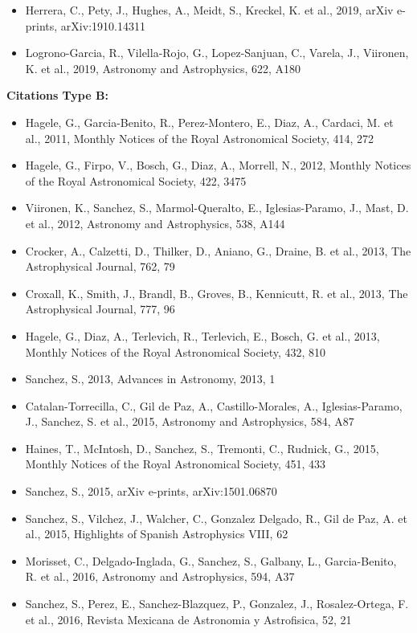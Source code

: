 \documentclass{letter}
\begin{document}
\begin{enumerate}
\begin{itemize}
\item Herrera, C., Pety, J., Hughes, A., Meidt, S., Kreckel, K. et al., 2019, arXiv e-prints, arXiv:1910.14311
\item Logrono-Garcia, R., Vilella-Rojo, G., Lopez-Sanjuan, C., Varela, J., Viironen, K. et al., 2019, Astronomy and Astrophysics, 622, A180
\end{itemize}
{\bf Citations Type B:}
\begin{itemize}
\item Hagele, G., Garcia-Benito, R., Perez-Montero, E., Diaz, A., Cardaci, M. et al., 2011, Monthly Notices of the Royal Astronomical Society, 414, 272
\item Hagele, G., Firpo, V., Bosch, G., Diaz, A., Morrell, N., 2012, Monthly Notices of the Royal Astronomical Society, 422, 3475
\item Viironen, K., Sanchez, S., Marmol-Queralto, E., Iglesias-Paramo, J., Mast, D. et al., 2012, Astronomy and Astrophysics, 538, A144
\item Crocker, A., Calzetti, D., Thilker, D., Aniano, G., Draine, B. et al., 2013, The Astrophysical Journal, 762, 79
\item Croxall, K., Smith, J., Brandl, B., Groves, B., Kennicutt, R. et al., 2013, The Astrophysical Journal, 777, 96
\item Hagele, G., Diaz, A., Terlevich, R., Terlevich, E., Bosch, G. et al., 2013, Monthly Notices of the Royal Astronomical Society, 432, 810
\item Sanchez, S., 2013, Advances in Astronomy, 2013, 1
\item Catalan-Torrecilla, C., Gil de Paz, A., Castillo-Morales, A., Iglesias-Paramo, J., Sanchez, S. et al., 2015, Astronomy and Astrophysics, 584, A87
\item Haines, T., McIntosh, D., Sanchez, S., Tremonti, C., Rudnick, G., 2015, Monthly Notices of the Royal Astronomical Society, 451, 433
\item Sanchez, S., 2015, arXiv e-prints, arXiv:1501.06870
\item Sanchez, S., Vilchez, J., Walcher, C., Gonzalez Delgado, R., Gil de Paz, A. et al., 2015, Highlights of Spanish Astrophysics VIII, 62
\item Morisset, C., Delgado-Inglada, G., Sanchez, S., Galbany, L., Garcia-Benito, R. et al., 2016, Astronomy and Astrophysics, 594, A37
\item Sanchez, S., Perez, E., Sanchez-Blazquez, P., Gonzalez, J., Rosalez-Ortega, F. et al., 2016, Revista Mexicana de Astronomia y Astrofisica, 52, 21

\end{itemize}
\end{enumerate}
\end{document}

